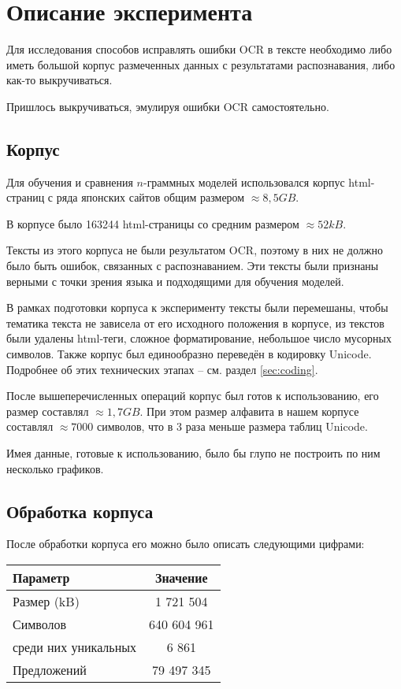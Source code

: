 \section{ Описание эксперимента }\label{sec:experiment}

Для исследования способов исправлять ошибки OCR в тексте необходимо либо иметь большой корпус размеченных данных с результатами распознавания, либо как-то выкручиваться. 

Пришлось выкручиваться, эмулируя ошибки OCR самостоятельно.


\subsection{ Корпус }

Для обучения и сравнения $n$-граммных моделей использовался корпус html-страниц с ряда японских сайтов  общим размером $\approx 8,5 GB$. 

В корпусе было 163244 html-страницы со средним размером $\approx 52 kB$.

Тексты из этого корпуса не были результатом OCR, поэтому в них не должно было быть ошибок, связанных с распознаванием. Эти тексты были признаны верными с точки зрения языка и подходящими для обучения моделей.

В рамках подготовки корпуса к эксперименту тексты были перемешаны, чтобы тематика текста не зависела от его исходного положения в корпусе, из текстов были удалены html-теги, сложное форматирование, небольшое число мусорных символов. Также корпус был единообразно переведён в кодировку Unicode. Подробнее об этих технических этапах -- см. раздел \cref{sec:coding}.

После вышеперечисленных операций корпус был готов к использованию, его размер составлял $\approx 1,7 GB$. При этом размер алфавита в нашем корпусе составлял $\approx 7000$ символов, что в 3 раза меньше размера таблиц Unicode.

Имея данные, готовые к использованию, было бы глупо не построить по ним несколько графиков.

\subsection{ Обработка корпуса }

После обработки корпуса его можно было описать следующими цифрами:

\begin{tabular}{l|c}
	Параметр & Значение \\ \hline 
	Размер (kB) & 1 721 504 \\
	Символов & 640 604 961 \\
	среди них уникальных & 6 861 \\
	Предложений & 79 497 345	\\  \hline
\end{tabular}


